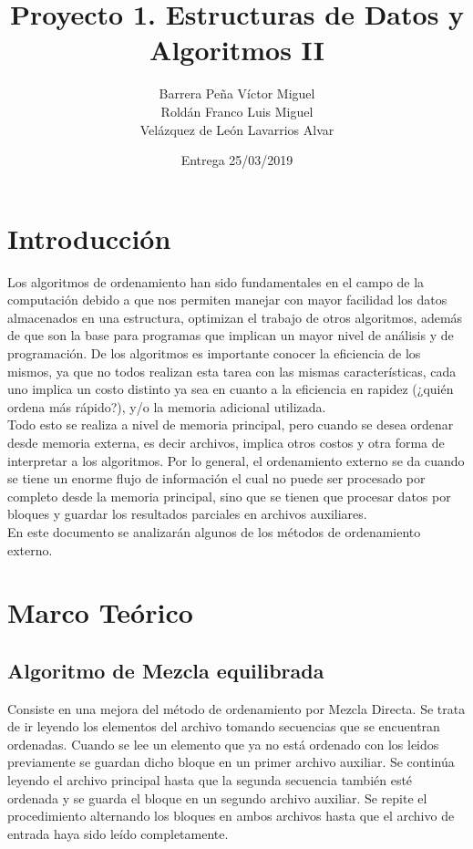\documentclass{article}
\title{Proyecto 1. Estructuras de Datos y Algoritmos II}
\author{Barrera Peña Víctor Miguel \\
		Roldán Franco Luis Miguel \\
		Velázquez de León Lavarrios Alvar 
	 }
\date{Entrega 25/03/2019}
\begin{document}
	\maketitle
	\section{Introducción}
	Los algoritmos de ordenamiento han sido fundamentales en el campo de la computación debido a que nos permiten manejar con mayor facilidad
	los datos almacenados en una estructura, optimizan el trabajo de otros algoritmos, además de que son la base para programas que implican un
	mayor nivel de análisis y de programación. De los algoritmos es importante conocer la eficiencia de los mismos, ya que no todos realizan esta tarea
	con las mismas características, cada uno implica un costo distinto ya sea en cuanto a la eficiencia en rapidez (¿quién ordena más rápido?), y/o la
	memoria adicional utilizada.\\
	
	Todo esto se realiza a nivel de memoria principal, pero cuando se desea ordenar desde memoria externa, es decir archivos, implica otros costos y otra
	forma de interpretar a los algoritmos. Por lo general, el ordenamiento externo se da cuando se tiene un enorme flujo de información el cual no puede ser procesado
	por completo desde la memoria principal, sino que se tienen que procesar datos por bloques y guardar los resultados parciales en archivos auxiliares.\\
	
	En este documento se analizarán algunos de los métodos de ordenamiento externo.
	
	\section{Marco Teórico}
		\subsection{Algoritmo de Mezcla equilibrada}
		Consiste en una mejora del método de ordenamiento por Mezcla Directa. Se trata de ir leyendo los elementos del archivo tomando secuencias que se encuentran ordenadas.
		Cuando se lee un elemento que ya no está ordenado con los leidos previamente se guardan dicho bloque en un primer archivo auxiliar. Se continúa leyendo el archivo
		principal hasta que la segunda secuencia también esté ordenada y se guarda el bloque en un segundo archivo auxiliar. Se repite el procedimiento alternando los bloques en ambos archivos
		hasta que el archivo de entrada haya sido leído completamente.\\
		
\end{document}
